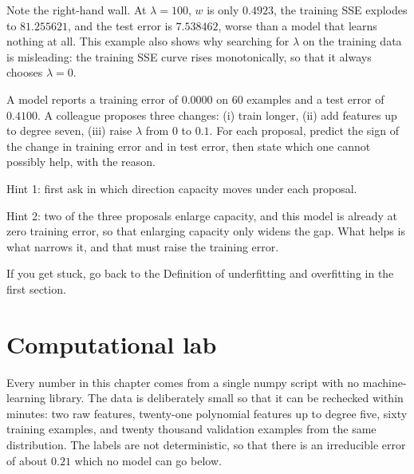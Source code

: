 Note the right-hand wall. At $\lambda=100$, $w$ is only $0.4923$, the training SSE
explodes to $81.255621$, and the test error is $7.538462$, worse than a model that
learns nothing at all. This example also shows why searching for $\lambda$ on the
training data is misleading: the training SSE curve rises monotonically, so that it
always chooses $\lambda=0$.

\begin{tantangan}
A model reports a training error of $0.0000$ on $60$ examples and a test error of
$0.4100$. A colleague proposes three changes: (i) train longer, (ii) add features up
to degree seven, (iii) raise $\lambda$ from $0$ to $0.1$. For each proposal, predict
the sign of the change in training error and in test error, then state which one
cannot possibly help, with the reason.

Hint 1: first ask in which direction capacity moves under each proposal.

Hint 2: two of the three proposals enlarge capacity, and this model is already at zero
training error, so that enlarging capacity only widens the gap. What helps is what
narrows it, and that must raise the training error.

If you get stuck, go back to the Definition of underfitting and overfitting in the
first section.
\end{tantangan}

\section{Computational lab}

Every number in this chapter comes from a single numpy script with no machine-learning
library. The data is deliberately small so that it can be rechecked within minutes: two
raw features, twenty-one polynomial features up to degree five, sixty training examples,
and twenty thousand validation examples from the same distribution. The labels are not
deterministic, so that there is an irreducible error of about $0.21$ which no model can
go below.

